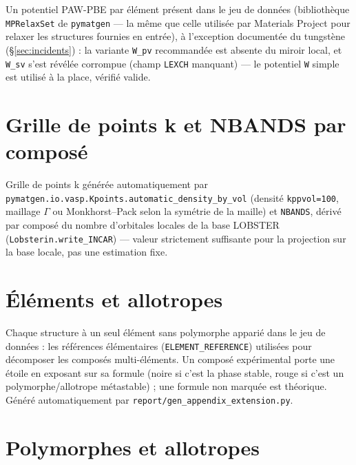 \documentclass[11pt,a4paper]{article}
\begin{document}
Un potentiel PAW-PBE par élément présent dans le jeu de données
(bibliothèque \texttt{MPRelaxSet} de \texttt{pymatgen} --- la même que
celle utilisée par Materials Project pour relaxer les structures fournies
en entrée), à l'exception documentée du tungstène (\S\ref{sec:incidents}) : la variante
\texttt{W\_pv} recommandée est absente du miroir local, et
\texttt{W\_sv} s'est révélée corrompue (champ \texttt{LEXCH} manquant) ---
le potentiel \texttt{W} simple est utilisé à la place, vérifié valide.

{\small

}

\section{Grille de points k et NBANDS par composé}
\label{sec:appendix-kpoints}

Grille de points k générée automatiquement par
\texttt{pymatgen.io.vasp.Kpoints.automatic\_density\_by\_vol} (densité
\texttt{kppvol=100}, maillage $\Gamma$ ou Monkhorst--Pack selon la symétrie
de la maille) et \texttt{NBANDS}, dérivé par composé du nombre d'orbitales
locales de la base LOBSTER (\texttt{Lobsterin.write\_INCAR}) --- valeur
strictement suffisante pour la projection sur la base locale, pas une
estimation fixe.

{\small

}

\section{Éléments et allotropes}
\label{sec:appendix-ext-elements}

Chaque structure à un seul élément sans polymorphe apparié dans le jeu
de données : les références élémentaires (\texttt{ELEMENT\_REFERENCE})
utilisées pour décomposer les composés multi-éléments. Un composé
expérimental porte une étoile en exposant sur sa formule (noire si
c'est la phase stable, rouge si c'est un polymorphe/allotrope
métastable) ; une formule non marquée est théorique. Généré
automatiquement par \texttt{report/gen\_appendix\_extension.py}.

{\small

}

\section{Polymorphes et allotropes}
\label{sec:appendix-ext-polymorphs}
\end{document}
